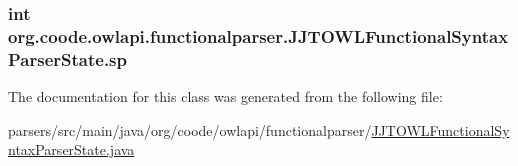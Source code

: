\hypertarget{classorg_1_1coode_1_1owlapi_1_1functionalparser_1_1_j_j_t_o_w_l_functional_syntax_parser_state_ad0b470dc3c7a57434fbfd9fbcbe40310}{
\subsubsection[{sp}]{\setlength{\rightskip}{0pt plus 5cm}int org.\-coode.\-owlapi.\-functionalparser.\-J\-J\-T\-O\-W\-L\-Functional\-Syntax\-Parser\-State.\-sp\hspace{0.3cm}{\ttfamily [private]}}}\label{classorg_1_1coode_1_1owlapi_1_1functionalparser_1_1_j_j_t_o_w_l_functional_syntax_parser_state_ad0b470dc3c7a57434fbfd9fbcbe40310}


The documentation for this class was generated from the following file\-:\begin{DoxyCompactItemize}
\item 
parsers/src/main/java/org/coode/owlapi/functionalparser/\hyperlink{_j_j_t_o_w_l_functional_syntax_parser_state_8java}{J\-J\-T\-O\-W\-L\-Functional\-Syntax\-Parser\-State.\-java}\end{DoxyCompactItemize}
